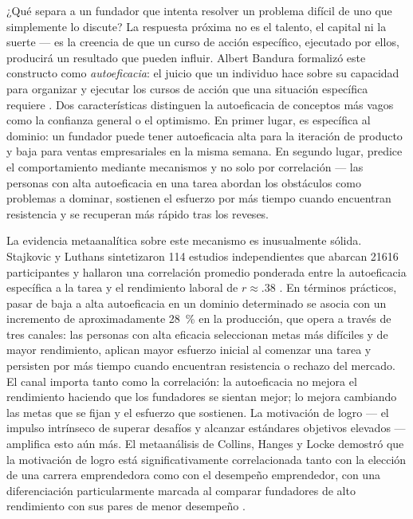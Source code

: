¿Qué separa a un fundador que intenta resolver un problema difícil de uno que simplemente lo
discute? La respuesta próxima no es el talento, el capital ni la suerte --- es la creencia de
que un curso de acción específico, ejecutado por ellos, producirá un resultado que pueden
influir. Albert Bandura formalizó este constructo como \emph{autoeficacia}: el juicio que un
individuo hace sobre su capacidad para organizar y ejecutar los cursos de acción que una
situación específica requiere \parencite{bandura1997self}. Dos características distinguen la
autoeficacia de conceptos más vagos como la confianza general o el optimismo. En primer lugar,
es específica al dominio: un fundador puede tener autoeficacia alta para la iteración de
producto y baja para ventas empresariales en la misma semana. En segundo lugar, predice el
comportamiento mediante mecanismos y no solo por correlación --- las personas con alta
autoeficacia en una tarea abordan los obstáculos como problemas a dominar, sostienen el
esfuerzo por más tiempo cuando encuentran resistencia y se recuperan más rápido tras los reveses.

La evidencia metaanalítica sobre este mecanismo es inusualmente sólida. Stajkovic y Luthans
sintetizaron \num{114} estudios independientes que abarcan \num{21616} participantes y hallaron
una correlación promedio ponderada entre la autoeficacia específica a la tarea y el rendimiento
laboral de $r \approx .38$ %
\parencite{stajkovic1998self}. En términos prácticos, pasar de baja a alta autoeficacia en un
dominio determinado se asocia con un incremento de aproximadamente \qty{28}{\percent} en la
producción, que opera a través de tres canales: las personas con alta eficacia seleccionan metas
más difíciles y de mayor rendimiento, aplican mayor esfuerzo inicial al comenzar una tarea y
persisten por más tiempo cuando encuentran resistencia o rechazo del mercado. El canal importa
tanto como la correlación: la autoeficacia no mejora el rendimiento haciendo que los fundadores
se sientan mejor; lo mejora cambiando las metas que se fijan y el esfuerzo que sostienen. La
motivación de logro --- el impulso intrínseco de superar desafíos y alcanzar estándares objetivos
elevados --- amplifica esto aún más. El metaanálisis de Collins, Hanges y Locke demostró que la
motivación de logro está significativamente correlacionada tanto con la elección de una carrera
emprendedora como con el desempeño emprendedor, con una diferenciación particularmente marcada
al comparar fundadores de alto rendimiento con sus pares de menor desempeño %
\parencite{collins2004achievement}.

